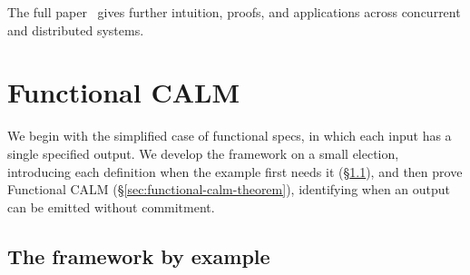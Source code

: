 \documentclass[sigconf]{cidr-2027}
\theoremstyle{remark}
\newcommand{\commitment}{commitment\xspace}
\begin{document}
\vspace{0.5em}
\noindent
The full paper~\cite{hellerstein2026completecalmfull} gives further
intuition, proofs, and applications across concurrent and distributed systems.

\section{Functional CALM}
\label{sec:functional-calm}

We begin with the simplified case of functional specs, in which each input has a
single specified output.  We develop the framework on a small election,
introducing each definition when the example first needs it
(\S\ref{sec:election-story}), and then prove Functional CALM
(\S\ref{sec:functional-calm-theorem}), identifying when an output can be
emitted without \commitment.

\subsection{The framework by example}
\label{sec:election-story}
\label{sec:framework-brief}
\label{sec:functional-specifications}
\label{sec:functional-events}
\label{sec:executions}
\end{document}
